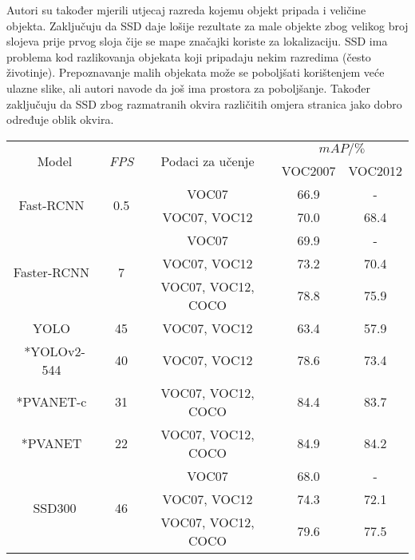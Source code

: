 \documentclass[utf8, diplomski, numeric, lmodern]{fer}
\begin{document}
Autori su također mjerili utjecaj razreda kojemu objekt pripada i veličine objekta. Zaključuju da SSD daje lošije rezultate za male objekte zbog velikog broj slojeva prije prvog sloja čije se mape značajki koriste za lokalizaciju. SSD ima problema kod razlikovanja objekata koji pripadaju nekim razredima (često životinje). Prepoznavanje malih objekata može se poboljšati korištenjem veće ulazne slike, ali autori navode da još ima prostora za poboljšanje. Također zaključuju da SSD zbog razmatranih okvira različitih omjera stranica jako dobro određuje oblik okvira.


\begin{table}[htbp]
	\centering
	\begin{tabular}{|c|c|c|c|c|}
		\hline
		\multirow{2}{*}{Model} & \multirow{2}{*}{\emph{FPS}} & \multirow{2}{*}{Podaci za učenje} & \multicolumn{2}{c|}{$\textit{mAP}/\%$} \\ \cline{4-5}
		& & & VOC2007 & VOC2012 \\
		\hline
		\multirow{2}{*}{Fast-RCNN~\cite{fastrcnn}} 
		& \multirow{2}{*}{0.5}
		& \footnotesize{VOC07} & 66.9 & - \\ \cline{3-5}
		& & \footnotesize{VOC07, VOC12} & 70.0 & 68.4 \\ \hline
		\multirow{3}{*}{Faster-RCNN~\cite{fasterrcnn}}
		& \multirow{3}{*}{7}
		  & \footnotesize{VOC07} & 69.9 & - \\ \cline{3-5}
		& & \footnotesize{VOC07, VOC12} & 73.2 & 70.4 \\ \cline{3-5}
		& & \footnotesize{VOC07, VOC12, COCO} & 78.8 & 75.9 \\ \hline
		YOLO~\cite{yolov2} & 45 & \footnotesize{VOC07, VOC12} & 63.4 & 57.9 \\ \hline
		*YOLOv2-544~\cite{yolov2} & 40 &  \footnotesize{VOC07, VOC12} & 78.6 & 73.4 \\ \hline
		*PVANET-c~\cite{pvanet} & 31 &  \footnotesize{VOC07, VOC12, COCO} & 84.4 & 83.7 \\ \hline
		*PVANET~\cite{pvanet} & 22 &  \footnotesize{VOC07, VOC12, COCO} & 84.9 & 84.2 \\ \hline
		\multirow{3}{*}{SSD300}
		& \multirow{3}{*}{46}
		  & \footnotesize{VOC07} & 68.0 & - \\ \cline{3-5}
		& & \footnotesize{VOC07, VOC12} & 74.3 & 72.1 \\ \cline{3-5}
		& & \footnotesize{VOC07, VOC12, COCO} & 79.6 & 77.5 \\ \hline

\end{tabular}
\end{table}
\end{document}
